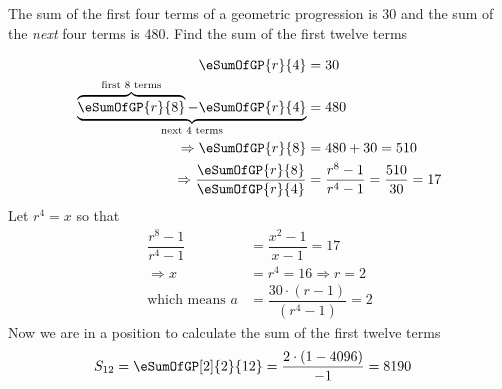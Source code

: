 
%
%
%
%
% 
% 

\question The sum of the first four terms of a geometric progression is 30 and the 
sum of the \textit{next} four terms is 480. Find the sum of the first twelve terms


\insertQR{}

\ifprintanswers
\fi 

\begin{solution}
	\begin{align}
		\eSumOfGP{r}{4} &= 30 \\
		\underbrace{\overbrace{\eSumOfGP{r}{8}}^{\text{first 8 terms}} 
		- \eSumOfGP{r}{4}}_{\text{next 4 terms}} &= 480 \\
		\Rightarrow \eSumOfGP{r}{8} &= 480 + 30 = 510 \\
		\Rightarrow \dfrac{\eSumOfGP{r}{8}}{\eSumOfGP{r}{4}} &= 
		\dfrac{r^8-1}{r^4-1} = \dfrac{510}{30} = 17
	\end{align}
	Let $r^4 =x$ so that
	\begin{align}
		\dfrac{r^8-1}{r^4-1} &= \dfrac{x^2-1}{x-1} = 17 \\
		\Rightarrow x &= r^4 = 16 \Rightarrow r = 2 \\
		\text{which means } a &= \dfrac{30\cdot(r-1)}{(r^4-1)} = 2
	\end{align}
	Now we are in a position to calculate the sum of the first twelve terms
	\begin{align}
		S_{12} &= \eSumOfGP[2]{2}{12} = \dfrac{2\cdot(1-4096)}{-1} = 8190
	\end{align}
\end{solution}
